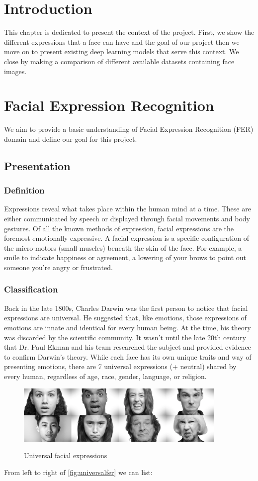 \documentclass[12pt,a4paper,oneside,english]{book}
\begin{document}
\section*{Introduction}
This chapter is dedicated to present the context of the project. First, we show the different expressions that a face can have and the goal of our project then we move on to present existing deep learning models that serve this context. We close by making a comparison of different available datasets containing face images.

\section{Facial Expression Recognition}
We aim to provide a basic understanding of Facial Expression Recognition (FER) domain and define our goal for this project.
\subsection{Presentation}
\subsubsection{Definition}
Expressions reveal what takes place within the human mind at a time. These are either communicated by speech or displayed through facial movements and body gestures. Of all the known methods of expression, facial expressions are the foremost emotionally expressive.
A facial expression is a specific configuration of the micro-motors (small muscles) beneath the skin of the face.
For example, a smile to indicate happiness or agreement, a lowering of your brows to point out someone you're angry or frustrated.
\subsubsection{Classification}
Back in the late 1800s, Charles Darwin was the first person to notice that facial expressions are universal. He suggested that, like emotions, those expressions of emotions are innate and identical for every human being. At the time, his theory was discarded by the scientific community.
It wasn’t until the late 20th century that Dr. Paul Ekman and his team researched the subject and provided evidence to confirm Darwin's theory.
While each face has its own unique traits and way of presenting emotions, there are 7 universal expressions (+ neutral) shared by every human, regardless of age, race, gender, language, or religion.
\begin{figure}[H]
    \centering
    \includegraphics[width=0.9\textwidth]{figures/universal_expressions.png}
    \caption{Universal facial expressions}
    \label{fig:universalfer}
    \cite{universalFER}
\end{figure}
\noindent
From left to right of \autoref{fig:universalfer} we can list:
\end{document}
